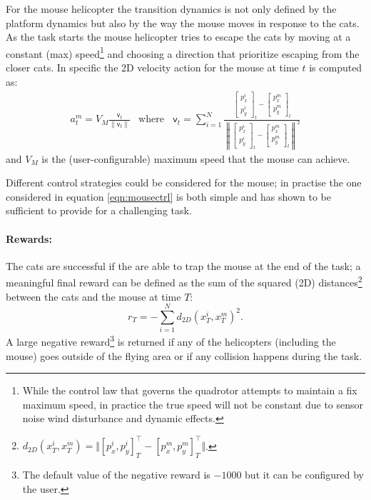 \documentclass[a4paper,11pt]{report}
\begin{document}
For the mouse helicopter the transition dynamics is 
not only defined by the platform dynamics but also by the way the mouse moves in response to the cats. 
 As the task starts the mouse helicopter tries to escape the cats by moving at a constant (max) speed\footnote{While the control law that governs the quadrotor attempts to maintain a fix maximum speed, in practice the true speed will not be constant due to sensor noise wind disturbance and dynamic effects.} and choosing a direction that prioritize escaping from the closer cats.
In specific the 2D velocity action for the mouse at time $t$ is computed as:
\begin{equation}\label{eqn:mousectrl}
\begin{array}{ll}
a^m_t = V_{M} \frac{\mathsf{v}_t}{\| \mathsf{v}_t \|} &
\text{where } \;\;\mathsf{v}_t = \sum_{i=1}^N \frac{\left[\begin{array}{c} p^i_x \\ p^i_y \end{array}\right]_t - \left[\begin{array}{c} p^m_x \\ p^m_y \end{array}\right]_t}{\left\| \left[\begin{array}{c} p^i_x \\ p^i_y \end{array}\right]_t - \left[\begin{array}{c} p^m_x \\ p^m_y \end{array}\right]_t \right\|^2}
\end{array}
\end{equation}
and $V_{M}$ is the (user-configurable) maximum speed that the mouse can achieve. 

Different control strategies could be considered for the mouse; in practise the one considered in equation \ref{eqn:mousectrl} is both simple and has shown to be sufficient to provide for a challenging task.


\paragraph{Rewards:}
The cats are successful if the are able to trap the mouse at the end of the task; a meaningful final reward can be defined as the sum of the squared (2D) distances\footnote{$d_{2D}(x^i_T,x^m_T) = \Vert[p^i_x,p^i_y]_T^\intercal - [p^m_x,p^m_y]_T^\intercal\Vert$.} between the cats and the mouse at time $T$:
$$r_T = - \sum^N_{i=1} d_{2D}(x^i_T,x^m_T)^2.$$
A large negative reward\footnote{The default value of the negative reward is $-1000$ but it can be configured by the user.} is returned if any of the helicopters (including the mouse) goes outside of the flying area or if any collision happens during the task.
\end{document}
